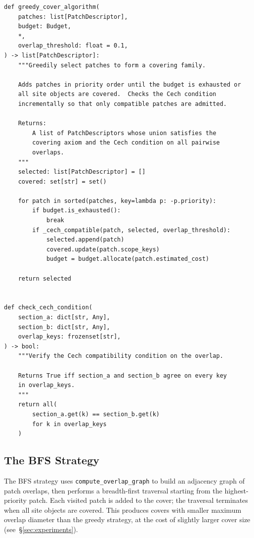 \documentclass[11pt]{article}
\begin{document}
\begin{lstlisting}[style=jugeo-python,
  caption={Greedy cover algorithm from \texttt{src/jugeo/generation/cover\_design/algorithms.py}.},
  label={lst:greedy}]
def greedy_cover_algorithm(
    patches: list[PatchDescriptor],
    budget: Budget,
    *,
    overlap_threshold: float = 0.1,
) -> list[PatchDescriptor]:
    """Greedily select patches to form a covering family.

    Adds patches in priority order until the budget is exhausted or
    all site objects are covered.  Checks the Cech condition
    incrementally so that only compatible patches are admitted.

    Returns:
        A list of PatchDescriptors whose union satisfies the
        covering axiom and the Cech condition on all pairwise
        overlaps.
    """
    selected: list[PatchDescriptor] = []
    covered: set[str] = set()

    for patch in sorted(patches, key=lambda p: -p.priority):
        if budget.is_exhausted():
            break
        if _cech_compatible(patch, selected, overlap_threshold):
            selected.append(patch)
            covered.update(patch.scope_keys)
            budget = budget.allocate(patch.estimated_cost)

    return selected


def check_cech_condition(
    section_a: dict[str, Any],
    section_b: dict[str, Any],
    overlap_keys: frozenset[str],
) -> bool:
    """Verify the Cech compatibility condition on the overlap.

    Returns True iff section_a and section_b agree on every key
    in overlap_keys.
    """
    return all(
        section_a.get(k) == section_b.get(k)
        for k in overlap_keys
    )
\end{lstlisting}

\subsection{The BFS Strategy}

The BFS strategy uses \texttt{compute\_overlap\_graph} to build an
adjacency graph of patch overlaps, then performs a breadth-first
traversal starting from the highest-priority patch.
Each visited patch is added to the cover; the traversal terminates
when all site objects are covered.
This produces covers with smaller maximum overlap diameter than the
greedy strategy, at the cost of slightly larger cover size
(see~\S\ref{sec:experiments}).
\end{document}

